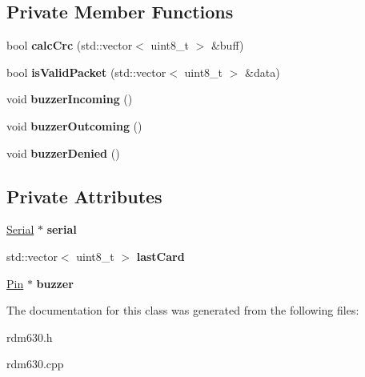 \subsection*{Private Member Functions}
\begin{DoxyCompactItemize}
\item 
\mbox{\label{classRdm6300_a5a57029ca033dfb57dacb8af1279a63c}} 
bool {\bfseries calc\+Crc} (std\+::vector$<$ uint8\+\_\+t $>$ \&buff)
\item 
\mbox{\label{classRdm6300_a11bf89a8c306cdf0c329eb535d20c154}} 
bool {\bfseries is\+Valid\+Packet} (std\+::vector$<$ uint8\+\_\+t $>$ \&data)
\item 
\mbox{\label{classRdm6300_a38956667d6cd8aa2746bcdbe8de77e0c}} 
void {\bfseries buzzer\+Incoming} ()
\item 
\mbox{\label{classRdm6300_a81a9625c32a797937fecfee9268ac79d}} 
void {\bfseries buzzer\+Outcoming} ()
\item 
\mbox{\label{classRdm6300_a067a47af67954c2e845743ea5de3ebb0}} 
void {\bfseries buzzer\+Denied} ()
\end{DoxyCompactItemize}
\subsection*{Private Attributes}
\begin{DoxyCompactItemize}
\item 
\mbox{\label{classRdm6300_aab29f639a26cfce2ef7865f829efc1d4}} 
\mbox{\hyperlink{classSerial}{Serial}} $\ast$ {\bfseries serial}
\item 
\mbox{\label{classRdm6300_ab67e1bc66505b024850419b28cb44371}} 
std\+::vector$<$ uint8\+\_\+t $>$ {\bfseries last\+Card}
\item 
\mbox{\label{classRdm6300_adbb47250f01692e5394006137e50a1fa}} 
\mbox{\hyperlink{classPin}{Pin}} $\ast$ {\bfseries buzzer}
\end{DoxyCompactItemize}


The documentation for this class was generated from the following files\+:\begin{DoxyCompactItemize}
\item 
rdm630.\+h\item 
rdm630.\+cpp\end{DoxyCompactItemize}
